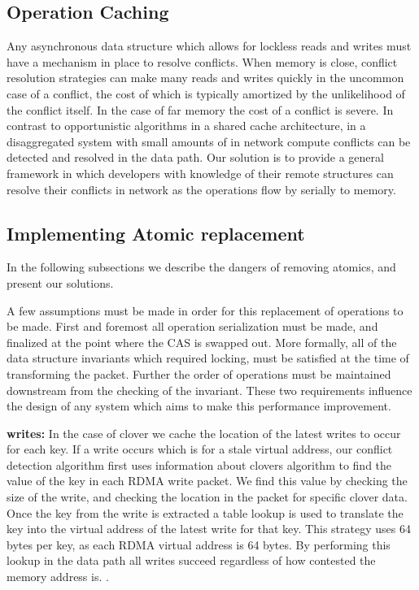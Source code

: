 \subsection{Operation Caching}
\label{sec:operation-caching}

Any asynchronous data structure which allows for lockless reads and writes must
have a mechanism in place to resolve conflicts. When memory is close, conflict
resolution strategies can make many reads and writes quickly in the uncommon
case of a conflict, the cost of which is typically amortized by the unlikelihood
of the conflict itself. In the case of far memory the cost of a conflict is
severe. In contrast to opportunistic algorithms in a shared cache architecture,
in a disaggregated system with small amounts of in network compute conflicts can
be detected and resolved in the data path. Our solution is to provide a general
framework in which developers with knowledge of their remote structures can
resolve their conflicts in network as the operations flow by serially to memory. 



\subsection{Implementing Atomic replacement}

In the
following subsections we describe the dangers of removing atomics, and present
our solutions.

A few assumptions must be made in order for this replacement of operations to be
made. First and foremost all operation serialization must be made, and finalized
at the point where the CAS is swapped out. More formally, all of the data
structure invariants which required locking, must be satisfied at the time of
transforming the packet. Further the order of operations must be maintained
downstream from the checking of the invariant. These two requirements influence
the design of any system which aims to make this performance improvement.

\textbf{writes:} In the case of clover we cache the location of the latest writes to occur for
each key. If a write occurs which is for a stale virtual address, our conflict
detection algorithm first uses information about clovers algorithm to find the
value of the key in each RDMA write packet. We find this value by checking the
size of the write, and checking the location in the packet for specific clover
data. Once the key from the write is extracted a table lookup is used to
translate the key into the virtual address of the latest write for that key.
This strategy uses 64 bytes per key, as each RDMA virtual address is 64 bytes.
By performing this lookup in the data path all writes succeed regardless of how
contested the memory address is. .

